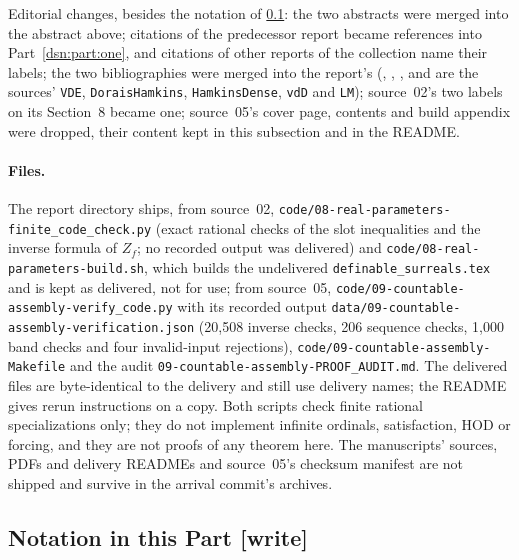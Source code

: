 \documentclass[11pt,a4paper]{article}
\numberwithin{equation}{section}
\theoremstyle{definition}
\theoremstyle{remark}
\newcommand{\HOD}{\mathrm{HOD}}
\newcommand{\fn}[1]{\nolinkurl{#1}}
\newcommand{\writetag}{\textup{\textsf{\small[write]}}}
\begin{document}
Editorial changes, besides the notation of \cref{dsn:rp:sub:notation}: the
two abstracts were merged into the abstract above; citations of the
predecessor report became references into Part~\ref{dsn:part:one}, and
citations of other reports of the collection name their labels; the two
bibliographies were merged into the report's (\cite{vdDE},
\cite{DoraisHamkins}, \cite{HamkinsDensity}, \cite{vddTame} and \cite{LM}
are the sources' \texttt{VDE}, \texttt{DoraisHamkins},
\texttt{HamkinsDense}, \texttt{vdD} and \texttt{LM}); source~02's two labels
on its Section~8 became one; source~05's cover page, contents and build
appendix were dropped, their content kept in this subsection and in the
README.

\paragraph{Files.} The report directory ships, from source~02,
\fn{code/08-real-parameters-finite_code_check.py} (exact rational checks of
the slot inequalities and the inverse formula of $Z_f$; no recorded output
was delivered) and \fn{code/08-real-parameters-build.sh}, which builds the
undelivered \fn{definable_surreals.tex} and is kept as delivered, not for
use; from source~05, \fn{code/09-countable-assembly-verify_code.py} with its
recorded output \fn{data/09-countable-assembly-verification.json} (20,508
inverse checks, 206 sequence checks, 1,000 band checks and four
invalid-input rejections), \fn{code/09-countable-assembly-Makefile} and the
audit \fn{09-countable-assembly-PROOF_AUDIT.md}. The delivered files are
byte-identical to the delivery and still use delivery names; the README
gives rerun instructions on a copy. Both scripts check finite rational
specializations only; they do not implement infinite ordinals,
satisfaction, $\HOD$ or forcing, and they are not proofs of any theorem
here. The manuscripts' sources, PDFs and delivery READMEs and source~05's
checksum manifest are not shipped and survive in the arrival commit's
archives.

\subsection{Notation in this Part \writetag}
\label{dsn:rp:sub:notation}
\end{document}
